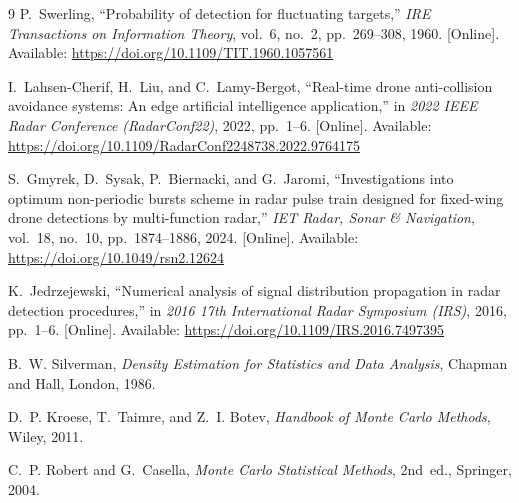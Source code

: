\begin{thebibliography}{9}
P.~Swerling,
``Probability of detection for fluctuating targets,''
\emph{IRE Transactions on Information Theory},
vol.~6, no.~2, pp.~269--308, 1960.
[Online]. Available: \url{https://doi.org/10.1109/TIT.1960.1057561}

I.~Lahsen-Cherif, H.~Liu, and C.~Lamy-Bergot,
``Real-time drone anti-collision avoidance systems: An edge artificial intelligence application,''
in \emph{2022 IEEE Radar Conference (RadarConf22)}, 2022, pp.~1--6.
[Online]. Available: \url{https://doi.org/10.1109/RadarConf2248738.2022.9764175}

S.~Gmyrek, D.~Sysak, P.~Biernacki, and G.~Jaromi,
``Investigations into optimum non-periodic bursts scheme in radar pulse train designed for fixed-wing drone detections by multi-function radar,''
\emph{IET Radar, Sonar \& Navigation},
vol.~18, no.~10, pp.~1874--1886, 2024.
[Online]. Available: \url{https://doi.org/10.1049/rsn2.12624}

K.~Jedrzejewski,
``Numerical analysis of signal distribution propagation in radar detection procedures,''
in \emph{2016 17th International Radar Symposium (IRS)}, 2016, pp.~1--6.
[Online]. Available: \url{https://doi.org/10.1109/IRS.2016.7497395}

B.~W. Silverman,
\emph{Density Estimation for Statistics and Data Analysis},
Chapman and Hall, London, 1986.

D.~P. Kroese, T.~Taimre, and Z.~I. Botev,
\emph{Handbook of Monte Carlo Methods},
Wiley, 2011.

C.~P. Robert and G.~Casella,
\emph{Monte Carlo Statistical Methods}, 2nd~ed.,
Springer, 2004.



\end{thebibliography}